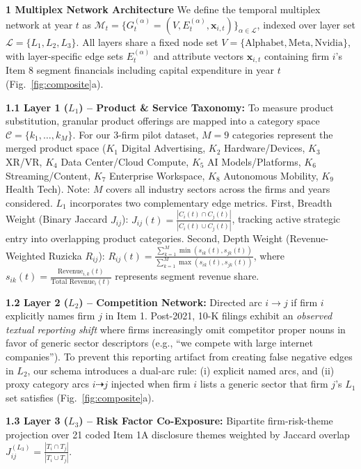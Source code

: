 \documentclass[10pt,letterpaper,twocolumn]{article}
\begin{document}
\vspace*{0.05cm}
\noindent\textbf{1 Multiplex Network Architecture}
We define the temporal multiplex network at year $t$ as 
$\mathcal{M}_t = \{G_t^{(\alpha)} = (V, E_t^{(\alpha)}, \mathbf{x}_{i,t})\}_{\alpha \in \mathcal{L}}$, 
indexed over layer set $\mathcal{L} = \{L_1, L_2, L_3\}$. All layers share a fixed node set 
$V = \{\text{Alphabet}, \text{Meta}, \text{Nvidia}\}$, with layer-specific edge sets $E_t^{(\alpha)}$ and attribute vectors
$\mathbf{x}_{i,t}$ containing firm $i$'s Item 8 segment financials including capital expenditure in year $t$ (Fig.~\ref{fig:composite}a).

\textbf{1.1 Layer 1 ($L_1$) -- Product \& Service Taxonomy:}
To measure product substitution, granular product offerings are mapped into a category space $\mathcal{C} = \{k_1, \dots, k_M\}$. For our 3-firm pilot dataset, $M=9$ categories represent the merged product space 
($K_1$ Digital Advertising, $K_2$ Hardware/Devices, $K_3$ XR/VR, $K_4$ Data Center/Cloud Compute, $K_5$ AI Models/Platforms, $K_6$ Streaming/Content, $K_7$ Enterprise Workspace, $K_8$ Autonomous Mobility, $K_9$ Health Tech).
Note: $M$ covers all industry sectors across the firms and years considered. $L_1$ incorporates two complementary edge metrics. 
First, Breadth Weight (Binary Jaccard $J_{ij}$): $J_{ij}(t) = \frac{|C_i(t) \cap C_j(t)|}{|C_i(t) \cup C_j(t)|}$, tracking active strategic entry into overlapping product categories.
Second, Depth Weight (Revenue-Weighted Ruzicka $R_{ij}$): $R_{ij}(t) = \frac{\sum_{k=1}^M \min(s_{ik}(t), s_{jk}(t))}{\sum_{k=1}^M \max(s_{ik}(t), s_{jk}(t))}$, where $s_{ik}(t) = \frac{\text{Revenue}_{i,k}(t)}{\text{Total Revenue}_i(t)}$ represents segment revenue share.

\textbf{1.2 Layer 2 ($L_2$) -- Competition Network:}
Directed arc $i \to j$ if firm $i$ explicitly names firm $j$ in Item 1. Post-2021, 10-K filings exhibit an \textit{observed textual reporting shift} where firms increasingly omit competitor proper nouns in favor of generic sector descriptors (e.g., ``we compete with large internet companies''). To prevent this reporting artifact from creating false negative edges in $L_2$, our schema introduces a dual-arc rule: (i) explicit named arcs, and (ii) proxy category arcs $i \dashrightarrow j$ injected when firm $i$ lists a generic sector that firm $j$'s $L_1$ set satisfies (Fig.\ \ref{fig:composite}a).

\textbf{1.3 Layer 3 ($L_3$) -- Risk Factor Co-Exposure:}
Bipartite firm-risk-theme projection over 21 coded Item 1A disclosure themes weighted by Jaccard overlap $J_{ij}^{(L_3)} = \frac{|T_i \cap T_j|}{|T_i \cup T_j|}$.
\end{document}
